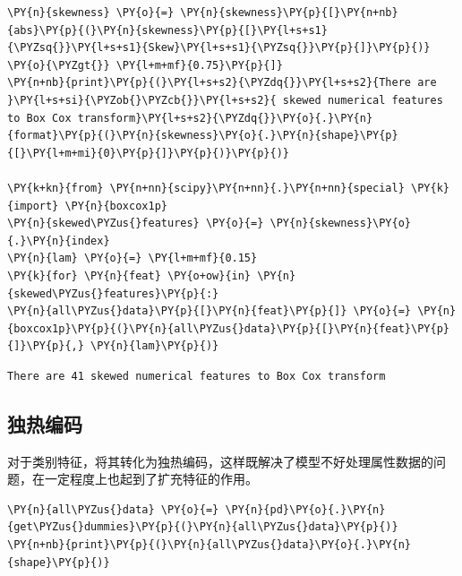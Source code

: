 \documentclass[no-math]{YangThesis}
\begin{document}
\begin{tcolorbox}[breakable, size=fbox, boxrule=1pt, pad at break*=1mm,colback=cellbackground, colframe=cellborder]
	\begin{Verbatim}[commandchars=\\\{\}]
\PY{n}{skewness} \PY{o}{=} \PY{n}{skewness}\PY{p}{[}\PY{n+nb}{abs}\PY{p}{(}\PY{n}{skewness}\PY{p}{[}\PY{l+s+s1}{\PYZsq{}}\PY{l+s+s1}{Skew}\PY{l+s+s1}{\PYZsq{}}\PY{p}{]}\PY{p}{)} \PY{o}{\PYZgt{}} \PY{l+m+mf}{0.75}\PY{p}{]}
\PY{n+nb}{print}\PY{p}{(}\PY{l+s+s2}{\PYZdq{}}\PY{l+s+s2}{There are }\PY{l+s+si}{\PYZob{}\PYZcb{}}\PY{l+s+s2}{ skewed numerical features to Box Cox transform}\PY{l+s+s2}{\PYZdq{}}\PY{o}{.}\PY{n}{format}\PY{p}{(}\PY{n}{skewness}\PY{o}{.}\PY{n}{shape}\PY{p}{[}\PY{l+m+mi}{0}\PY{p}{]}\PY{p}{)}\PY{p}{)}

\PY{k+kn}{from} \PY{n+nn}{scipy}\PY{n+nn}{.}\PY{n+nn}{special} \PY{k}{import} \PY{n}{boxcox1p}
\PY{n}{skewed\PYZus{}features} \PY{o}{=} \PY{n}{skewness}\PY{o}{.}\PY{n}{index}
\PY{n}{lam} \PY{o}{=} \PY{l+m+mf}{0.15}
\PY{k}{for} \PY{n}{feat} \PY{o+ow}{in} \PY{n}{skewed\PYZus{}features}\PY{p}{:}
\PY{n}{all\PYZus{}data}\PY{p}{[}\PY{n}{feat}\PY{p}{]} \PY{o}{=} \PY{n}{boxcox1p}\PY{p}{(}\PY{n}{all\PYZus{}data}\PY{p}{[}\PY{n}{feat}\PY{p}{]}\PY{p}{,} \PY{n}{lam}\PY{p}{)}
	\end{Verbatim}
\end{tcolorbox}

\begin{Verbatim}[commandchars=\\\{\}]
There are 41 skewed numerical features to Box Cox transform
\end{Verbatim}

\hypertarget{ux72ecux70edux7f16ux7801}{%
	\subsection{独热编码}\label{ux72ecux70edux7f16ux7801}}

对于类别特征，将其转化为独热编码，这样既解决了模型不好处理属性数据的问题，在一定程度上也起到了扩充特征的作用。

\begin{tcolorbox}[breakable, size=fbox, boxrule=1pt, pad at break*=1mm,colback=cellbackground, colframe=cellborder]
	\begin{Verbatim}[commandchars=\\\{\}]
\PY{n}{all\PYZus{}data} \PY{o}{=} \PY{n}{pd}\PY{o}{.}\PY{n}{get\PYZus{}dummies}\PY{p}{(}\PY{n}{all\PYZus{}data}\PY{p}{)}
\PY{n+nb}{print}\PY{p}{(}\PY{n}{all\PYZus{}data}\PY{o}{.}\PY{n}{shape}\PY{p}{)}
	\end{Verbatim}
\end{tcolorbox}
\end{document}
